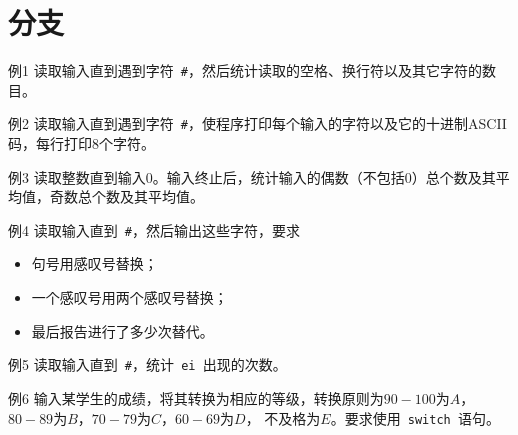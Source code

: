 \section{分支}
\begin{frame}[fragile]\ft{\secname}
\begin{block}{例1}
读取输入直到遇到字符\lstinline| #|，然后统计读取的空格、换行符以及其它字符的数目。
\end{block}
\end{frame}

\begin{frame}[fragile]\ft{\secname}
\begin{block}{例2}
读取输入直到遇到字符\lstinline| #|，使程序打印每个输入的字符以及它的十进制ASCII码，每行打印8个字符。
\end{block}
\end{frame}


\begin{frame}[fragile]\ft{\secname}
\begin{block}{例3}
读取整数直到输入0。输入终止后，统计输入的偶数（不包括0）总个数及其平均值，奇数总个数及其平均值。
\end{block}
\end{frame}

\begin{frame}[fragile]\ft{\secname}
\begin{block}{例4}
读取输入直到\lstinline| #|，然后输出这些字符，要求
\begin{itemize}
\item 句号用感叹号替换；
\item 一个感叹号用两个感叹号替换；
\item 最后报告进行了多少次替代。
\end{itemize}
\end{block}
\end{frame}

\begin{frame}[fragile]\ft{\secname}
\begin{block}{例5}
读取输入直到\lstinline| #|，统计\lstinline| ei |出现的次数。
\end{block}
\end{frame}

\begin{frame}[fragile]\ft{\secname}
\begin{block}{例6}
输入某学生的成绩，将其转换为相应的等级，转换原则为$90-100$为$A$，$80-89$为$B$，$70-79$为$C$，$60-69$为$D$，
不及格为$E$。要求使用\lstinline| switch |语句。
\end{block}
\end{frame}

